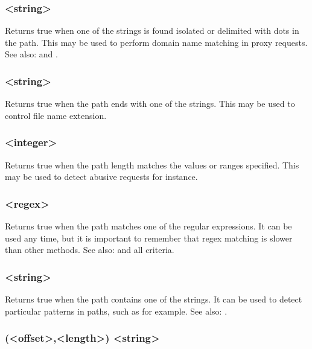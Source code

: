 \subsubsection[path\_dom]{ <string>}

  Returns true when one of the strings is found isolated or delimited with dots
  in the path. This may be used to perform domain name matching in proxy
  requests. See also:  and .

\subsubsection[path\_end]{ <string>}

  Returns true when the path ends with one of the strings. This may be used to
  control file name extension.

\subsubsection[path\_len]{ <integer>}

  Returns true when the path length matches the values or ranges specified.
  This may be used to detect abusive requests for instance.

\subsubsection[path\_reg]{ <regex>}

  Returns true when the path matches one of the regular expressions. It can be
  used any time, but it is important to remember that regex matching is slower
  than other methods. See also:  and all  criteria.

\subsubsection[path\_sub]{ <string>}

  Returns true when the path contains one of the strings. It can be used to
  detect particular patterns in paths, such as  for example. See also:   .

\subsubsection[payload]{(<offset>,<length>) <string>}

